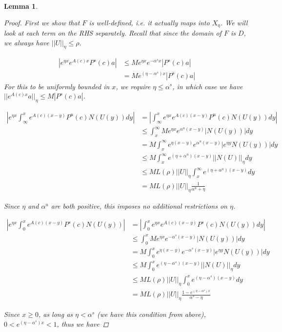 \documentclass[12pt]{article}
\newtheorem{lemma}{Lemma}
\begin{document}
\begin{lemma}
\begin{proof}
First we show that $F$ is well-defined, i.e. it actually maps into $X_\eta$. We will look at each term on the RHS separately. Recall that since the domain of $F$ is $D$, we always have $||U||_\eta \leq \rho$.

\begin{align*}
|e^{\eta x} e^{A(c)x } P^s(c) a | &\leq M e^{\eta x} e^{-\alpha^s x} | P^s(c) a |\\
&= M e^{(\eta - \alpha^s)x} | P^s(c) a|
\end{align*}
For this to be uniformly bounded in $x$, we require $\eta \leq \alpha^s$, in which case we have $||e^{A(c)x}a ||_\eta \leq M| P^s(c) a |$.

\begin{align*}
\left| e^{\eta x} \int_\infty^x e^{A(c)(x - y)}P^u(c) N(U(y))dy \right| &= \left| \int_\infty^x e^{\eta x} e^{A(c)(x - y)}P^u(c) N(U(y))dy \right|\\
&\leq \int_x^\infty M e^{\eta x}e^{\alpha^u(x -y)}|N(U(y))|dy \\
&= M \int_x^\infty e^{\eta (x - y)}e^{\alpha^u(x -y)}| e^{\eta y} N(U(y))|dy \\
&\leq M \int_x^\infty e^{(\eta+\alpha^u)(x - y)} || N(U)||_\eta dy \\
&\leq M L(\rho) ||U||_\eta \int_x^\infty e^{(\eta+\alpha^u)(x - y)} dy \\
&= M L(\rho) ||U||_\eta \frac{1}{\alpha^u + \eta}
\end{align*}

Since $\eta$ and $\alpha^u$ are both positive, this imposes no additional restrictions on $\eta$.

\begin{align*}
\left| e^{\eta x} \int_0^x e^{A(c)(x - y)}P^s(c) N(U(y)) \right| &= \left| \int_0^x e^{\eta x} e^{A(c)(x - y)}P^s(c) N(U(y)) dy \right|\\
&\leq \int_0^x M e^{\eta x}e^{-\alpha^s(x -y)}|N(U(y))|dy \\
&= M \int_0^x e^{\eta (x - y)}e^{-\alpha^s(x -y)}| e^{\eta y} N(U(y))|dy \\
&\leq M \int_0^x e^{(\eta-\alpha^s)(x - y)} || N(U)||_\eta dy \\
&\leq M L(\rho) ||U||_\eta \int_0^x e^{(\eta-\alpha^s)(x - y)} dy \\
&= M L(\rho) ||U||_\eta \frac{1 - e^{(\eta-\alpha^s)x} }{\alpha^s - \eta}
\end{align*}

Since $x \geq 0$, as long as $\eta < \alpha^s$ (we have this condition from above), $0 < e^{(\eta-\alpha^s)x} < 1$, thus we have


\end{proof}
\end{lemma}
\end{document}
